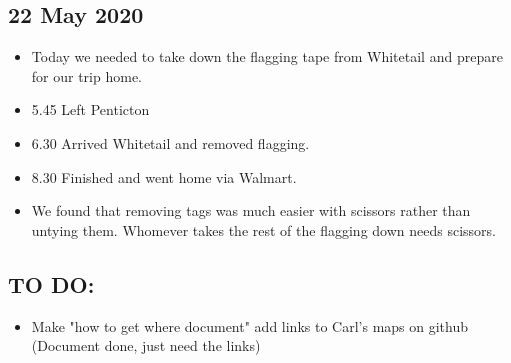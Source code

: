 \documentclass[11pt,letter]{article}
\newenvironment{smitemize}{
\begin{itemize}
  \setlength{\itemsep}{0pt}
  \setlength{\parskip}{0.8pt}
  \setlength{\parsep}{0pt}}
{\end{itemize}
}
\begin{document}
\subsection{22 May 2020}
\begin{smitemize}
\item Today we needed to take down the flagging tape from Whitetail and prepare for our trip home. 
\item 5.45 Left Penticton
\item 6.30 Arrived Whitetail and removed flagging.
\item 8.30 Finished and went home via Walmart.
\item We found that removing tags was much easier with scissors rather than untying them. Whomever takes the rest of the flagging down needs scissors.  
\end{smitemize}

\subsection{TO DO:}
\begin{smitemize}
\item Make "how to get where document" add links to Carl's maps on github (Document done, just need the links)

\end{smitemize}
\end{document}
